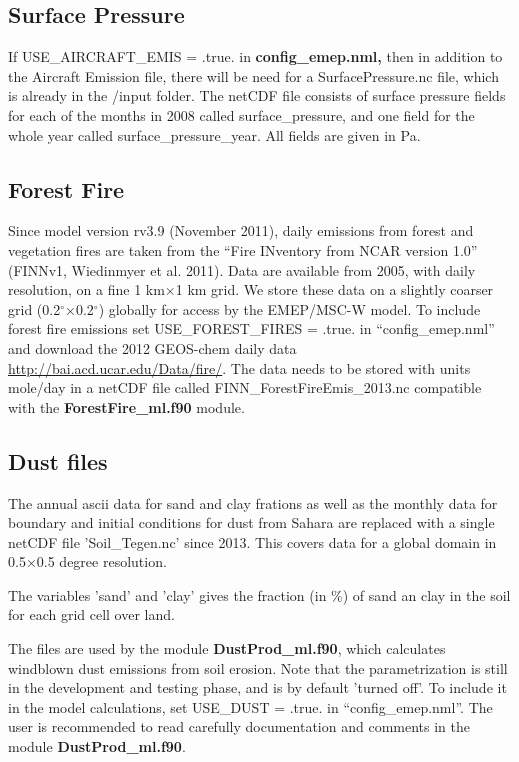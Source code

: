 \subsection{Surface Pressure}

If USE\_AIRCRAFT\_EMIS = .true. in { \bf config\_emep.nml,} then in addition to the Aircraft 
Emission file, there will be need for a SurfacePressure.nc file, which is already in the /input folder. 
The netCDF file consists of surface pressure fields for each of the months in 2008 called surface\_pressure, 
and one field for the whole year called surface\_pressure\_year. All fields are given in Pa. 

\subsection{Forest Fire}
\label{emisff}

Since model version rv3.9 (November 2011), daily emissions from forest and vegetation fires are taken from the “Fire INventory from NCAR version 1.0” (FINNv1,
Wiedinmyer et al. 2011). Data are available from 2005, with daily resolution, on a fine 1 km×1 km grid. We store these data on a slightly coarser grid (0.2$^\circ$×0.2$^\circ$) globally for access by the EMEP/MSC-W model. To include forest fire emissions set 
USE\_FOREST\_FIRES = .true. in ``config\_emep.nml'' and download the 
2012 GEOS-chem daily data \url{http://bai.acd.ucar.edu/Data/fire/}. The data needs to be stored with units mole/day in a netCDF file called FINN\_ForestFireEmis\_2013.nc 
compatible with the { \bf ForestFire\_ml.f90 } module. 

\subsection{Dust files}

The annual ascii data for sand and clay frations as well as the monthly data for boundary and initial conditions for dust from Sahara are replaced with a single netCDF file 'Soil\_Tegen.nc' since 2013.   This covers data for a global domain in 0.5$\times$0.5 degree resolution.  

The variables 'sand' and 'clay' gives the fraction (in \%)  
of sand an clay in the soil for each grid cell over land. 



The files are used by the module {\bf DustProd\_ml.f90}, which calculates windblown dust 
emissions from soil erosion. Note that the parametrization is still in the development and 
testing phase, and is by default 'turned off'. To include it in the model calculations, set 
USE\_DUST = .true. in ``config\_emep.nml''.
The user is recommended to read carefully documentation and
comments in the module {\bf DustProd\_ml.f90}.

